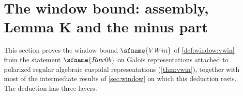 \section{The window bound: assembly, Lemma K and the minus part}\label{sec:pf:vwin}

\providecommand{\vwinQZ}{\Q_\ell/\Z_\ell}
\providecommand{\vwincyc}{\chi_{\mathrm{cyc}}}
\providecommand{\vwinsh}{\mathrm{shaLen}}
\providecommand{\vwinVt}{\widetilde V}
\providecommand{\vwinX}{\mathcal X}
\providecommand{\vwinmin}{\mathrm{minusLen}}
\providecommand{\vwinplus}{\mathrm{plusLen}}
\providecommand{\vwincok}{\lambda^{\mathrm{co}}}
\providecommand{\vwinVL}{\mathrm{VLen}}
\providecommand{\vwinexc}{\mathrm{Exc}}
\providecommand{\vwinpt}{\mathrm{pt}}

This section proves the window bound $\sfname{VWin}$ of \cref{def:window:vwin} from the statement
$\sfname{Row0b}$ on Galois representations attached to polarized regular algebraic cuspidal representations
(\cref{thm:vwin}), together with most of the intermediate results of \cref{sec:window} on which this deduction
rests. The deduction has three layers.
